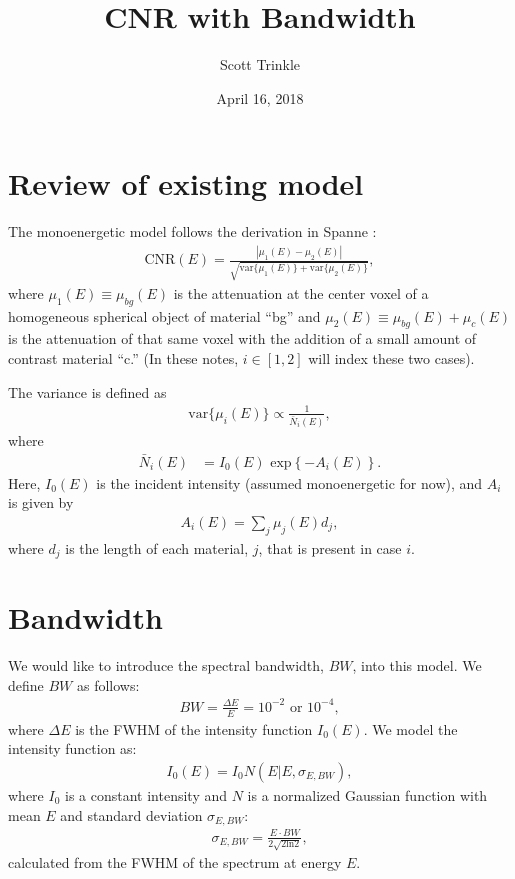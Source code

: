 \documentclass[11pt]{article}
\author{Scott Trinkle}
\date{April 16, 2018}
\title{CNR with Bandwidth}
\begin{document}
\maketitle

\section{Review of existing model}
The monoenergetic model follows the derivation in Spanne \cite{Spanne1989}:
\begin{align}
  \text{CNR}(E) = \frac{|\mu_1(E) - \mu_2(E)|}{\sqrt{\text{var}\{\mu_1(E)\} + \text{var}\{\mu_2(E)\}}},
  \label{eq:CNR}
\end{align}
where $\mu_1(E) \equiv \mu_{bg}(E)$ is the attenuation at the center voxel of a
homogeneous spherical object of material ``bg'' and
$\mu_2(E) \equiv \mu_{bg}(E) + \mu_c(E)$ is the attenuation of that same voxel
with the addition of a small amount of contrast material ``c.'' (In these notes,
$i \in [1,2]$ will index these two cases).

The variance is defined as
\begin{align}
  \text{var}\{\mu_i(E)\} \propto \frac{1}{\bar{N}_i(E)},
  \label{eq:var}
\end{align}
where
\begin{align}
  \bar{N}_i(E) &= I_0(E) \text{ exp}\left\{-A_i(E)\right\}.
\end{align}
Here, $I_0(E)$ is the incident intensity (assumed monoenergetic for now), and
$A_i$ is given by
\begin{align}
  A_i(E) = \sum_{j}\mu_j(E) d_j,
  \label{eq:Ai}
\end{align}
where $d_j$ is the length of each material, $j$, that is present in case $i$.

\section{Bandwidth}

We would like to introduce the spectral bandwidth, $BW$, into this model. We
define $BW$ as follows:
\begin{align}
  BW = \frac{\Delta E}{E} = 10^{-2}\text{ or } 10^{-4},
\end{align}
where $\Delta E$ is the FWHM of the intensity function $I_0(E)$.
We model the intensity function as:
\begin{align}
  I_0(E) = I_0 N(E | E, \sigma_{E,BW}),
\end{align}
where $I_0$ is a constant intensity and $N$ is a normalized Gaussian function with mean
$E$ and standard deviation $\sigma_{E, BW}$:
\begin{align}
  \sigma_{E,BW} = \frac{E\cdot BW}{2\sqrt{2\text{ln}2}},
  \label{eq:sigma}
\end{align}
calculated from the FWHM of the spectrum at energy $E$.
\end{document}
